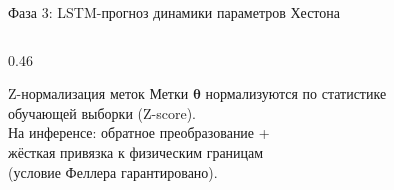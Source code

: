 \documentclass[aspectratio=169, 10pt]{beamer}
\begin{document}
\begin{frame}{Фаза 3: LSTM-прогноз динамики параметров Хестона}
\begin{columns}[T]
\begin{column}{0.46\textwidth}
      \vspace{0.4em}
      \begin{alertblock}{Z-нормализация меток}
        \small
        Метки $\boldsymbol\theta$ нормализуются по статистике\\
        обучающей выборки (Z-score).\\[0.2em]
        На инференсе: обратное преобразование +\\
        жёсткая привязка к физическим границам\\
        (условие Феллера гарантировано).
      \end{alertblock}
    \end{column}

  \end{columns}
\end{frame}
\end{document}
